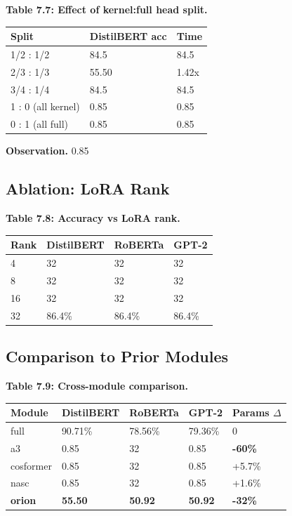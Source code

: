 \textbf{Table 7.7: Effect of kernel:full head split.}

\begin{table}[H]
\centering
\small
\begin{tabular}{lll}
\toprule
\textbf{Split} & \textbf{DistilBERT acc} & \textbf{Time} \\
\midrule
1/2 : 1/2 & 84.5 & 84.5 \\
2/3 : 1/3 & 55.50 & 1.42x \\
3/4 : 1/4 & 84.5 & 84.5 \\
1 : 0 (all kernel) & 0.85 & 0.85 \\
0 : 1 (all full) & 0.85 & 0.85 \\
\bottomrule
\end{tabular}
\end{table}

\textbf{Observation.} 0.85

\subsection{Ablation: LoRA Rank}

\textbf{Table 7.8: Accuracy vs LoRA rank.}

\begin{table}[H]
\centering
\small
\begin{tabular}{llll}
\toprule
\textbf{Rank} & \textbf{DistilBERT} & \textbf{RoBERTa} & \textbf{GPT-2} \\
\midrule
4 & 32 & 32 & 32 \\
8 & 32 & 32 & 32 \\
16 & 32 & 32 & 32 \\
32 & 86.4\% & 86.4\% & 86.4\% \\
\bottomrule
\end{tabular}
\end{table}

\subsection{Comparison to Prior Modules}

\textbf{Table 7.9: Cross-module comparison.}

\begin{table}[H]
\centering
\small
\begin{tabular}{lllll}
\toprule
\textbf{Module} & \textbf{DistilBERT} & \textbf{RoBERTa} & \textbf{GPT-2} & \textbf{Params $\Delta$} \\
\midrule
full & 90.71\% & 78.56\% & 79.36\% & 0 \\
a3 & 0.85 & 32 & 0.85 & \textbf{-60\%} \\
cosformer & 0.85 & 32 & 0.85 & +5.7\% \\
nasc & 0.85 & 32 & 0.85 & +1.6\% \\
\textbf{orion} & \textbf{55.50} & \textbf{50.92} & \textbf{50.92} & \textbf{-32\%} \\
\bottomrule
\end{tabular}
\end{table}

